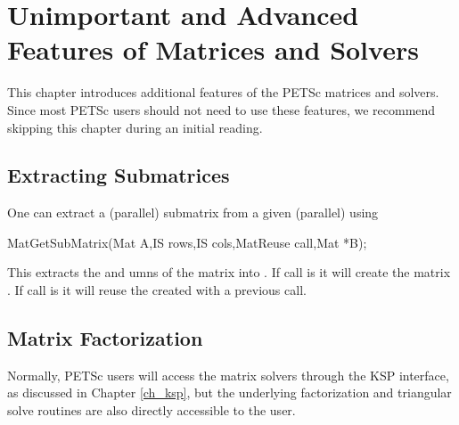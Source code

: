 {{{%

\cleardoublepage
\chapter{Unimportant and Advanced Features of Matrices and Solvers}
\label{ch_advanced}

This chapter introduces additional features of the PETSc matrices and solvers.
Since most PETSc users should not need to use these features, 
we recommend skipping this chapter during an initial reading.

\medskip \medskip

\section{Extracting Submatrices} 

One can extract a (parallel) submatrix from a given (parallel) using
\begin{tabbing}
  MatGetSubMatrix(Mat A,IS rows,IS cols,MatReuse call,Mat *B);
\end{tabbing}
This extracts the  and umns of the matrix  into . If 
call is    it will create the matrix
. If call is   it will reuse the 
created with a previous call. 

\medskip \medskip

\section{Matrix Factorization} 
\label{sec_matfactor}

Normally, PETSc users will access the matrix solvers through the 
KSP interface, as discussed in Chapter \ref{ch_ksp}, but the underlying 
factorization and triangular solve routines are also directly 
accessible to the user.

\medskip \medskip

}}}
